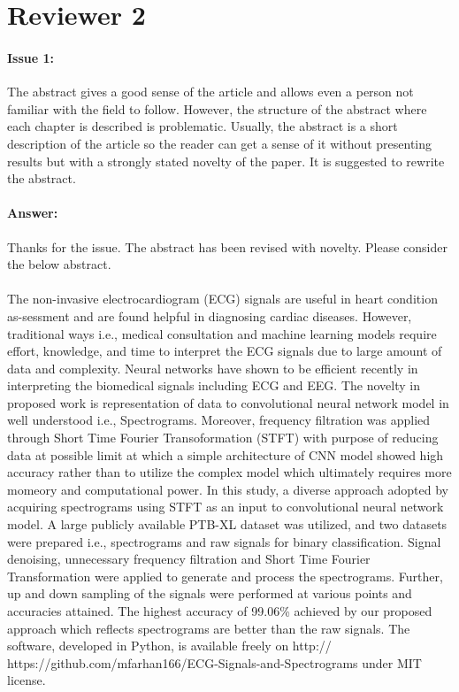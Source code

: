 \documentclass{article}
\begin{document}
\section{Reviewer 2}

\paragraph{Issue 1:}
\begin{displayquote}
The abstract gives a good sense of the article and allows even a person not familiar with the field to follow. However, the structure of the abstract where each chapter is described is problematic. Usually, the abstract is a short description of the article so the reader can get a sense of it without presenting results but with a strongly stated novelty of the paper. It is suggested to rewrite the abstract.
\end{displayquote}

\paragraph{Answer:}
Thanks for the issue. The abstract has been revised with novelty. Please consider the below abstract. \\ \\ The non-invasive electrocardiogram (ECG) signals are useful in heart condition as-sessment and are found helpful in diagnosing cardiac diseases. However, traditional ways i.e., medical consultation and machine learning models require effort, knowledge, and time to interpret the ECG signals due to large amount of data and complexity. Neural networks have shown to be efficient recently in interpreting the biomedical signals including ECG and EEG. The novelty in proposed work is representation of data to convolutional neural network model in well understood i.e., Spectrograms. Moreover, frequency filtration was applied through Short Time Fourier Transoformation (STFT) with purpose of reducing data at possible limit at which a simple architecture of CNN model showed high accuracy rather than to utilize the complex model which ultimately requires more momeory and computational power. In this study, a diverse approach adopted by acquiring spectrograms using STFT as an input to convolutional neural network model. A large publicly available PTB-XL dataset was utilized, and two datasets were prepared i.e., spectrograms and raw signals for binary classification. Signal denoising, unnecessary frequency filtration and Short Time Fourier Transformation were applied to generate and process the spectrograms. Further, up and down sampling of the signals were performed at various points and accuracies attained. The highest accuracy of 99.06\% achieved by our proposed approach which reflects spectrograms are better than the raw signals. The software, developed in Python, is available freely on http:// https://github.com/mfarhan166/ECG-Signals-and-Spectrograms under MIT license. \\\\
\end{document}
